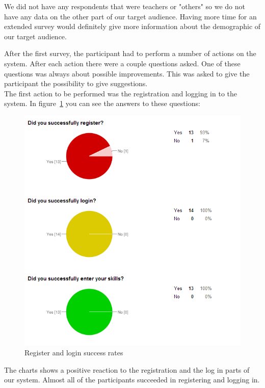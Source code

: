 We did not have any respondents that were teachers or "others" so we do not have any data on the other part of our target audience.
Having more time for an extended survey would definitely give more information about the demographic of our target audience.

After the first survey, the participant had to perform a number of actions on the system.
After each action there were a couple questions asked.
One of these questions was always about possible improvements.
This was asked to give the participant the possibility to give suggestions.\\
The first action to be performed was the registration and logging in to the system.
In figure~\ref{register_login_chart} you can see the answers to these questions:\\
\begin{figure}[H]
    \centering
    \includegraphics[width=\textwidth]{images/register_login_chart}
    \caption{Register and login success rates}
    \label{register_login_chart}
\end{figure}

The charts shows a positive reaction to the registration and the log in parts of our system.
Almost all of the participants succeeded in registering and logging in.

